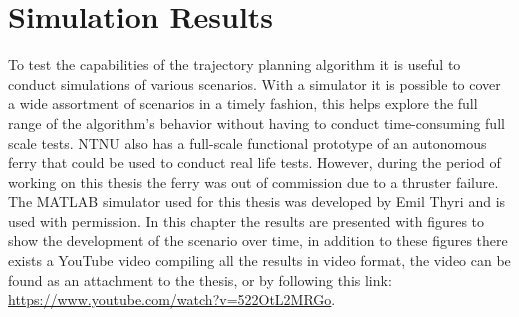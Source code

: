 \section{Simulation Results}


To test the capabilities of the trajectory planning algorithm it is useful to conduct simulations of various scenarios.
With a simulator it is possible to cover a wide assortment of scenarios in a timely fashion, this helps explore the full
range of the algorithm's behavior without having to conduct time-consuming full scale tests. NTNU also has a full-scale
functional prototype of an autonomous ferry that could be used to conduct real life tests. However, during the period of working
on this thesis the ferry was out of commission due to a thruster failure.
The MATLAB simulator used for this thesis was developed by Emil Thyri and is used with permission. In this chapter the results
are presented with figures to show the development of the scenario over time, in addition to these figures there exists a YouTube video compiling
all the results in video format, the video can be found as an attachment to the thesis, or by following this link: \url{https://www.youtube.com/watch?v=522OtL2MRGo}.

